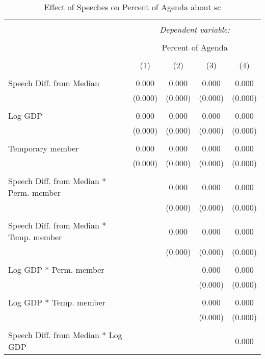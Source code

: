 
\begin{table}[!htbp] \centering 
  \caption{Effect of Speeches on Percent of Agenda about sc} 
  \label{} 
\begin{tabular}{@{\extracolsep{5pt}}lcccc} 
\\[-1.8ex]\hline 
\hline \\[-1.8ex] 
 & \multicolumn{4}{c}{\textit{Dependent variable:}} \\ 
\cline{2-5} 
\\[-1.8ex] & \multicolumn{4}{c}{Percent of Agenda} \\ 
\\[-1.8ex] & (1) & (2) & (3) & (4)\\ 
\hline \\[-1.8ex] 
 Speech Diff. from Median & 0.000 & 0.000 & 0.000 & 0.000 \\ 
  & (0.000) & (0.000) & (0.000) & (0.000) \\ 
  & & & & \\ 
 Log GDP & 0.000 & 0.000 & 0.000 & 0.000 \\ 
  & (0.000) & (0.000) & (0.000) & (0.000) \\ 
  & & & & \\ 
 Temporary member & 0.000 & 0.000 & 0.000 & 0.000 \\ 
  & (0.000) & (0.000) & (0.000) & (0.000) \\ 
  & & & & \\ 
 Speech Diff. from Median * Perm. member &  & 0.000 & 0.000 & 0.000 \\ 
  &  & (0.000) & (0.000) & (0.000) \\ 
  & & & & \\ 
 Speech Diff. from Median * Temp. member &  & 0.000 & 0.000 & 0.000 \\ 
  &  & (0.000) & (0.000) & (0.000) \\ 
  & & & & \\ 
 Log GDP * Perm. member &  &  & 0.000 & 0.000 \\ 
  &  &  & (0.000) & (0.000) \\ 
  & & & & \\ 
 Log GDP * Temp. member &  &  & 0.000 & 0.000 \\ 
  &  &  & (0.000) & (0.000) \\ 
  & & & & \\ 
 Speech Diff. from Median * Log GDP &  &  &  & 0.000 \\ 

\end{tabular}
\end{table}
